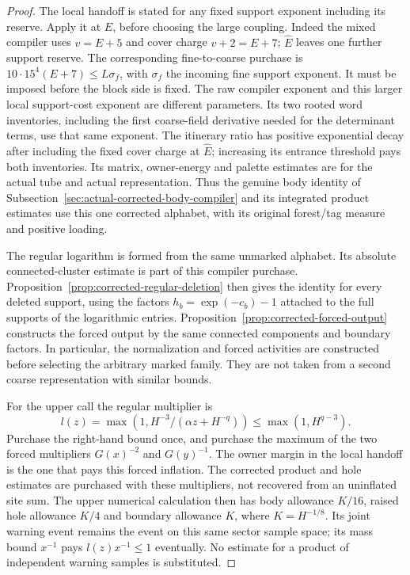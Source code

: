 \begin{proof}
The local handoff is stated for any fixed support exponent including
its reserve. Apply it at $\widehat E$, before choosing the large coupling.
Indeed the mixed compiler uses $v=E+5$ and cover charge $v+2=E+7$;
$\widehat E$ leaves one further support reserve. The corresponding
fine-to-coarse purchase is
$10\cdot15^4(E+7)\le L\sigma_f$, with $\sigma_f$ the
incoming fine support exponent. It must be imposed before the block
side is fixed. The raw compiler exponent and this larger local
support-cost exponent are different parameters.
Its two rooted word inventories, including the first coarse-field
derivative needed for the determinant terms, use that same exponent.
The itinerary ratio has positive exponential decay after including
the fixed cover charge at $\widehat E$; increasing its entrance threshold
pays both inventories. Its matrix, owner-energy and palette estimates
are for the actual tube and actual representation. Thus the genuine
body identity of Subsection~\ref{sec:actual-corrected-body-compiler}
and its integrated product estimates use this one corrected alphabet,
with its original forest/tag measure and positive loading.

The regular logarithm is formed from the same unmarked alphabet.
Its absolute connected-cluster estimate is part of this compiler
purchase. Proposition~\ref{prop:corrected-regular-deletion} then
gives the identity for every deleted support, using the factors
$h_b=\exp(-c_b)-1$ attached to the full supports of the logarithmic
entries. Proposition~\ref{prop:corrected-forced-output} constructs
the forced output by the same connected components and boundary
factors. In particular, the normalization and forced activities are
constructed before selecting the arbitrary marked family. They are
not taken from a second coarse representation with similar bounds.

For the upper call the regular multiplier is
\[
 l(z)=\max(1,H^{-3}/(\alpha z+H^{-q}))
       \le\max(1,H^{q-3}).
\]
Purchase the right-hand bound once, and purchase the maximum of the
two forced multipliers $G(x)^{-2}$ and $G(y)^{-1}$. The owner
margin in the local handoff is the one that pays this forced
inflation. The corrected product and hole estimates are purchased
with these multipliers, not recovered from an uninflated site sum.
The upper numerical calculation then has body allowance $K/16$,
raised hole allowance $K/4$ and boundary allowance $K$, where
$K=H^{-1/8}$. Its joint warning event remains the event on this
same sector sample space; its mass bound $x^{-1}$ pays
$l(z)x^{-1}\le1$ eventually. No estimate for a product of
independent warning samples is substituted.


\end{proof}
